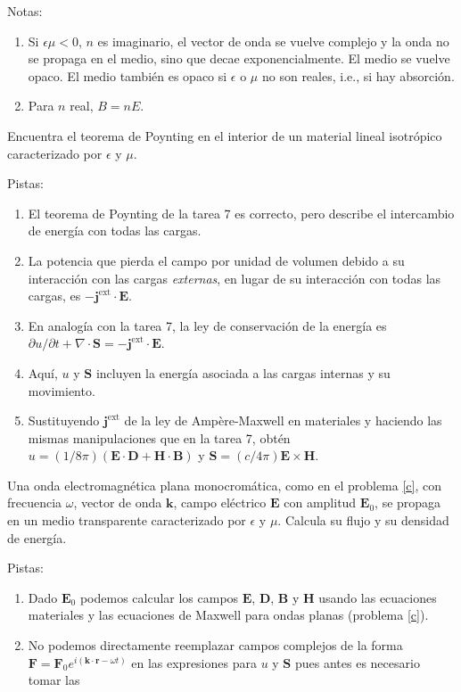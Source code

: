 \documentclass{exam}
\newenvironment{pistas}{\par\noindent Pistas:\begin{enumerate}} {\end{enumerate}}
\newenvironment{notas}{\par\noindent Notas:\begin{enumerate}} {\end{enumerate}}
\begin{document}
\begin{questions}
\begin{notas}
   por lo que $n=\sqrt\epsilon$.
 \item Si $\epsilon\mu<0$, $n$ es imaginario, el vector de onda se
   vuelve complejo y la onda no se propaga en el medio, sino que decae
   exponencialmente. El medio se vuelve opaco. El medio también es
   opaco si $\epsilon$ o $\mu$ no son reales, i.e., si hay absorción.
 \item Para $n$ real, $B=nE$.
 \end{notas}
\question\label{e} Encuentra el teorema de Poynting en el interior de un
  material lineal isotrópico caracterizado por $\epsilon$ y $\mu$.
  \begin{pistas}
  \item El teorema de Poynting de la tarea 7 es correcto, pero
    describe el intercambio de energía con todas las cargas.
  \item La potencia que pierda el campo por unidad de volumen debido a
    su interacción con las cargas {\em externas}, en lugar de su
    interacción con todas las cargas, es $-\bm j^{\text{ext}}\cdot\bm
    E$.
  \item En analogía con la tarea 7, la ley de conservación de la
    energía es $\partial u/\partial t+\nabla\cdot\bm S=-\bm
    j^{\text{ext}}\cdot\bm E$.
  \item Aquí, $u$ y $\bm S$ incluyen la energía asociada a las cargas
    internas y su movimiento.
  \item Sustituyendo $\bm j^{\text{ext}}$ de la ley de Ampère-Maxwell
    en materiales y haciendo las mismas manipulaciones que en la tarea
    7, obtén $u=(1/8\pi)(\bm E\cdot\bm D+\bm H\cdot\bm B)$ y $\bm
    S=(c/4\pi)\bm E\times\bm H$.
  \end{pistas}
\question\label{f} Una onda electromagnética plana monocromática, como
  en el problema \ref{c}, con frecuencia $\omega$, vector de onda $\bm
  k$, campo eléctrico $\bm E$ con amplitud $\bm E_0$, se propaga en un
  medio transparente caracterizado por $\epsilon$ y $\mu$. Calcula su flujo y su
  densidad de energía.
  \begin{pistas}
  \item Dado $\bm E_0$ podemos calcular los campos
    $\bm E$, $\bm D$, $\bm B$ y $\bm H$ usando las ecuaciones
    materiales y las ecuaciones de Maxwell para ondas planas (problema
    \ref{c}).
  \item No podemos directamente reemplazar campos complejos de la
    forma $\bm F=\bm F_0 e^{i(\bm k\cdot\bm r-\omega t)}$ en las
    expresiones para $u$ y $\bm S$ pues antes es necesario tomar las

\end{pistas}
\end{questions}
\end{document}
